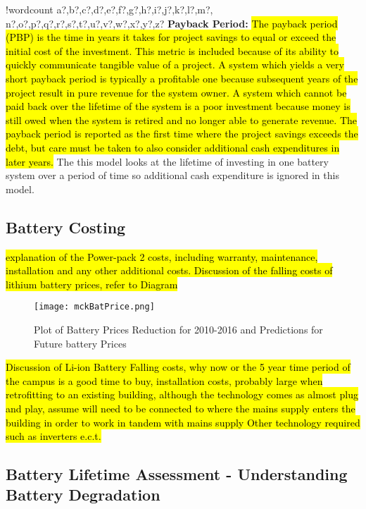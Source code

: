 \documentclass[fontsize=9.5pt]{extarticle}
\numberwithin{figure}{section} %
\newcounter{words}
\newenvironment{counted}{%
  \setcounter{words}{0}
  \SearchList!{wordcount}{\stepcounter{words}}
    {a?,b?,c?,d?,e?,f?,g?,h?,i?,j?,k?,l?,m?,
    n?,o?,p?,q?,r?,s?,t?,u?,v?,w?,x?,y?,z?}
  \UndoBoundary{'}
  \SearchOrder{p;}}{%
  \StopSearching}
\begin{document}
\begin{counted}
\textbf{Payback Period:}
\hl{The payback period (PBP) is the time in years it takes for project savings to equal or exceed the initial cost of the investment. This metric is included because of its ability to quickly communicate tangible value of a project. A system which yields a very short payback period is typically a profitable one because subsequent years of the project result in pure revenue for the system owner. A system which cannot be paid back over the lifetime of the system is a poor investment because money is still owed when the system is retired and no longer able to generate revenue. The payback period is reported as the first time where the project savings exceeds the debt, but care must be taken to also consider additional cash expenditures in later years.}
\cite{diorio2015economic} The this model looks at the lifetime of
investing in one battery system over a period of time so additional cash
expenditure is ignored in this model.

\subsection{Battery Costing}\label{battery-costing}

\hl{explanation of the Power-pack 2 costs, including warranty, maintenance, installation and any other additional costs. Discussion of the falling costs of lithium battery prices, refer to Diagram}

\begin{figure}[H]
  \centering
  \texttt{[image: mckBatPrice.png]}
  \caption{Plot of Battery Prices Reduction for 2010-2016 and Predictions for Future battery Prices \cite{mckBat}}
  \label{mckBatPrice}
\end{figure}

\hl{Discussion of Li-ion Battery Falling costs, why now or the 5 year time period of the campus is a good time to buy, installation costs, probably large when retrofitting to an existing building, although the technology comes as almost plug and play, assume will need to be connected to where the mains supply enters the building in order to work in tandem with mains supply Other technology required such as inverters e.c.t.}

\subsection{Battery Lifetime Assessment - Understanding Battery
Degradation}\label{battery-lifetime-assessment---understanding-battery-degradation}


\end{counted}
\end{document}
